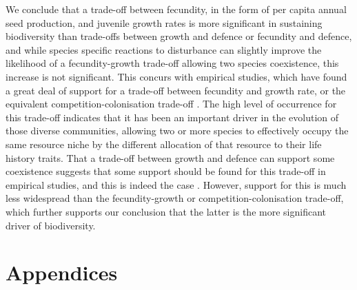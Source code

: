 We conclude that a trade-off between fecundity, in the form of per capita annual seed production, and juvenile growth rates is more significant in sustaining biodiversity than trade-offs between growth and defence or fecundity and defence, and while species specific reactions to disturbance can slightly improve the likelihood of a fecundity-growth trade-off allowing two species coexistence, this increase is not significant. This concurs with empirical studies, which have found a great deal of support for a trade-off between fecundity and growth rate, or the equivalent competition-colonisation trade-off \citep[e.g.][]{levins1971regional,yu2001competition,tilman1994competition,adler2000space}. The high level of occurrence for this trade-off indicates that it has been an important driver in the evolution of those diverse communities, allowing two or more species to effectively occupy the same resource niche by the different allocation of that resource to their life history traits. That a trade-off between growth and defence can support some coexistence suggests that some support should be found for this trade-off in empirical studies, and this is indeed the case \citep[e.g.][]{wright2010functional,fine2006growth}. However, support for this is much less widespread than the fecundity-growth or competition-colonisation trade-off, which further supports our conclusion that the latter is the more significant driver of biodiversity.

\section*{Appendices}

\bappendix
